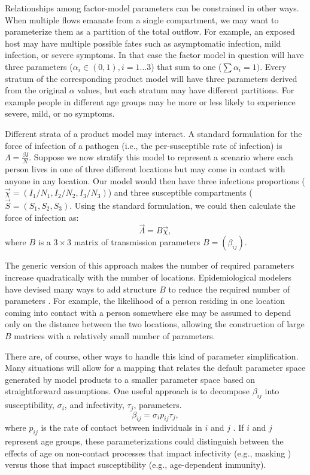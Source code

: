 Relationships among factor-model parameters can be constrained in other ways. When multiple flows emanate from a single compartment, we may want to parameterize them as a partition of the total outflow. For example, an exposed host may have multiple possible fates such as asymptomatic infection, mild infection, or severe symptoms. In that case the factor model in question will have three parameters ($\alpha_i \in (0,1), i = 1 \ldots 3$) that sum to one ($\sum \alpha_i = 1)$. Every stratum of the corresponding product model will have three parameters derived from the original $\alpha$ values,  but each stratum may have different partitions. For example people in different age groups may be more or less likely to experience severe, mild, or no symptoms. 

Different strata of a product model may interact.
A standard formulation for the force of infection of a pathogen (i.e., the per-susceptible rate of infection) is
$\Lambda = \frac{\beta I}{N}$. Suppose we now stratify this model to represent a scenario where each person lives in one of three different locations but may come in contact with anyone in any location. Our model would then have three infectious proportions ($\vec{\chi} = (I_1/N_1, I_2/N_2, I_3/N_3)$) and three susceptible compartments ($\vec{S} = (S_1, S_2, S_3)$.
Using the standard formulation, we could then calculate the force of infection as:
$$
    \vec{\Lambda} =  B \vec{\chi}, 
$$
where $B$ is a $3 \times 3$ matrix of transmission parameters $B = \left(\beta_{ij}\right)$.

The generic version of this approach makes the number of required parameters increase quadratically with the number of locations. Epidemiological modelers have devised many ways to add structure $B$ to reduce the required number of parameters \cite{andemay85, andemaybook, grenande85}. 
For example, the likelihood of a person residing in one location coming into contact with a person somewhere else may be assumed to depend only on the distance between the two locations, allowing the construction of large $B$ matrices with a relatively small number of parameters. 

There are, of course, other ways to handle this kind of parameter simplification. Many situations will allow for a mapping that relates the default parameter space generated by model products to a smaller parameter space based on straightforward assumptions.  One useful approach is to decompose $\beta_{ij}$ into susceptibility, $\sigma_i$, and infectivity, $\tau_j$, parameters.
$$
    \beta_{ij} = \sigma_ip_{ij}\tau_j,
$$
where $p_{ij}$ is the rate of contact between individuals in $i$ and $j$ . If $i$ and $j$ represent age groups, these parameterizations could distinguish between the effects of age on non-contact processes that impact infectivity (e.g., masking ) versus those that impact susceptibility (e.g., age-dependent immunity). 

